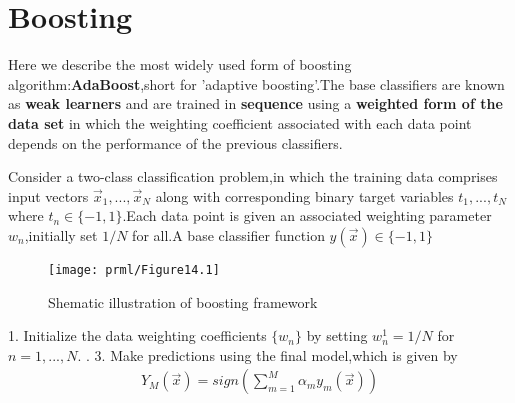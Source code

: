 \section{Boosting}
Here we describe the most widely used form of boosting algorithm:\textbf{AdaBoost},short for 'adaptive boosting'.The base classifiers are known as \textbf{weak learners} and are trained in \textbf{sequence} using a \textbf{weighted form of the data set} in which the weighting coefficient associated with each data point depends on the performance of the previous classifiers.

Consider a two-class classification problem,in which the training data comprises input vectors $\vec{x}_1,...,\vec{x}_N$ along with corresponding binary target variables $t_1,...,t_N$ where $t_n\in \{-1,1\}$.Each data point is given an associated weighting parameter $w_n$,initially set $1/N$ for all.A base classifier function $y(\vec{x})\in \{-1,1\}$
\begin{SCfigure*}
	\caption{Shematic illustration of boosting framework}
	\texttt{[image: prml/Figure14.1]}
\end{SCfigure*}

\begin{algorithm}[H]
	\caption{\color{red}{AdaBoost}}
	\label{algo:AdaBoost}
	\DontPrintSemicolon %
	1. Initialize the data weighting coefficients $\{w_n\}$ by setting $w_n^{1}=1/N$ for $n=1,...,N$. . 
	3. Make predictions using the final model,which is given by
	\begin{align}
	Y_M(\vec{x})=sign(\sum_{m=1}^{M}\alpha_m y_m(\vec{x}))
	\end{align}
		
\end{algorithm}

